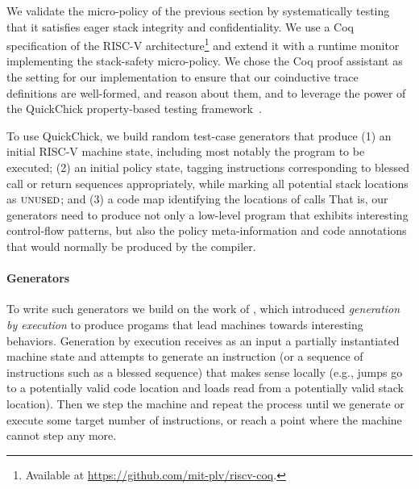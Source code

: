 \documentclass[acmsmall,review,anonymous]{acmart}\settopmatter{printfolios=true,printccs=false,printacmref=false}
\begin{document}
{{We validate the micro-policy of the previous section by
systematically testing that it satisfies eager stack integrity and
confidentiality. We use a Coq specification of the RISC-V
architecture\footnote{Available at \url{https://github.com/mit-plv/riscv-coq}.}
and extend it with a
runtime monitor implementing the stack-safety
micro-policy. We
  chose the Coq proof assistant as the setting for our implementation
  to ensure that our coinductive trace
  definitions are well-formed, and reason about them, and to leverage the power of the
  QuickChick property-based testing framework~\citep{Pierce:SF4}.

To use QuickChick, we build random test-case generators that produce
(1) an initial RISC-V machine state, including most notably
  the program to be executed;
(2)
  an initial policy state, tagging instructions corresponding to
  blessed call or return sequences appropriately, while marking
  all potential stack locations as $\textsc{unused}$; and
(3)
 a code map identifying the locations of calls
%
That is, our generators need to produce not only a low-level program
that exhibits interesting control-flow patterns, but also the policy
meta-information and code annotations that would normally be produced
by the compiler.

\paragraph*{Generators}

To write such generators we build on the work of
\citet{TestingNI:ICFP, DBLP:journals/jfp/HritcuLSADHPV16}, which
introduced {\em generation by execution} to produce progams that lead
machines towards interesting behaviors. Generation by
execution receives as an input a partially instantiated machine state
and attempts to generate an instruction (or a sequence of instructions
such as a blessed sequence) that makes sense locally (e.g., jumps go
to a potentially valid code location and loads read from a
potentially valid stack location). Then we step the machine and repeat
the process until we generate or execute some target number of
instructions, or reach a point where the machine cannot step
any more.

}}
\end{document}
